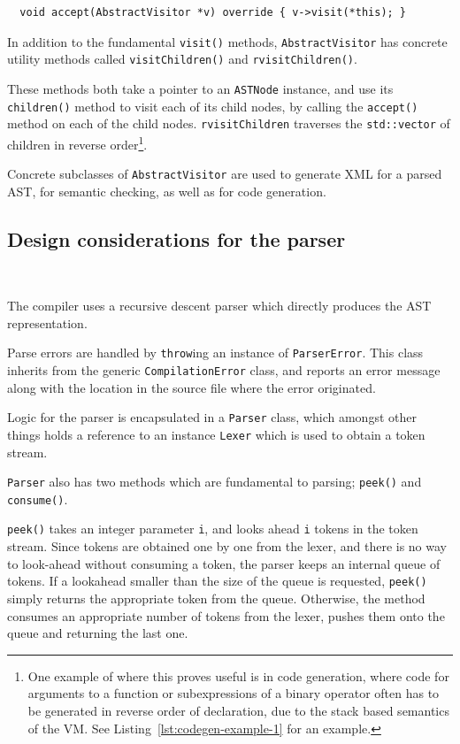 \documentclass[11pt,a4paper]{scrartcl}
\begin{document}
\begin{verbatim}
  void accept(AbstractVisitor *v) override { v->visit(*this); }
\end{verbatim}

In addition to the fundamental \verb|visit()| methods, \verb!AbstractVisitor! has concrete utility methods called \verb!visitChildren()! and \verb!rvisitChildren()!.

These methods both take a pointer to an \verb!ASTNode! instance, and use its \verb!children()! method to visit each of its child nodes, by calling the \verb!accept()! method on each of the child nodes. \verb!rvisitChildren! traverses the \verb!std::vector! of children in reverse order\footnote{One example of where this proves useful is in code generation, where code for arguments to a function or subexpressions of a binary operator often has to be generated in reverse order of declaration, due to the stack based semantics of the VM. See Listing~\ref{lst:codegen-example-1} for an example.}.

Concrete subclasses of \verb!AbstractVisitor! are used to generate XML for a parsed AST, for semantic checking, as well as for code generation.

\subsection{Design considerations for the parser}~\label{sec:parser}

The compiler uses a recursive descent parser\cite{cooper2011} which directly produces the AST representation.

Parse errors are handled by \verb!throw!ing an instance of \verb!ParserError!. This class inherits from the generic \verb!CompilationError! class, and reports an error message along with the location in the source file where the error originated.

Logic for the parser is encapsulated in a \verb!Parser! class, which amongst other things holds a reference to an instance \verb|Lexer| which is used to obtain a token stream.

\verb|Parser| also has two methods which are fundamental to parsing; \verb!peek()! and \verb!consume()!.

\verb!peek()! takes an integer parameter \verb|i|, and looks ahead \verb|i| tokens in the token stream. Since tokens are obtained one by one from the lexer, and there is no way to look-ahead without consuming a token, the parser keeps an internal queue of tokens. If a lookahead smaller than the size of the queue is requested, \verb!peek()! simply returns the appropriate token from the queue. Otherwise, the method consumes an appropriate number of tokens from the lexer, pushes them onto the queue and returning the last one.
\end{document}
